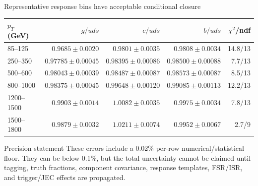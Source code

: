 \documentclass[aspectratio=169,10pt]{beamer}
\begin{document}
\begin{frame}{Representative response bins have acceptable conditional closure}
\centering
\small
\begin{tabular}{lrrrr}
\toprule
$p_T$ (GeV) & $g/uds$ & $c/uds$ & $b/uds$ & $\chi^2$/ndf\\
\midrule
85--125 & $0.9685\pm0.0020$ & $0.9801\pm0.0035$ & $0.9808\pm0.0034$ & 14.8/13\\
250--350 & $0.97785\pm0.00045$ & $0.98395\pm0.00086$ & $0.98500\pm0.00088$ & 7.7/13\\
500--600 & $0.98043\pm0.00039$ & $0.98487\pm0.00087$ & $0.98573\pm0.00087$ & 8.5/13\\
800--1000 & $0.98375\pm0.00045$ & $0.99648\pm0.00120$ & $0.99085\pm0.00113$ & 12.2/13\\
1200--1500 & $0.9903\pm0.0014$ & $1.0082\pm0.0035$ & $0.9975\pm0.0034$ & 7.8/13\\
1500--1800 & $0.9879\pm0.0032$ & $1.0211\pm0.0074$ & $0.9952\pm0.0067$ & 2.7/9\\
\bottomrule
\end{tabular}
\vspace{0.8em}
\begin{alertblock}{Precision statement}
These errors include a 0.02\% per-row numerical/statistical floor. They can be below 0.1\%, but the total uncertainty cannot be claimed until tagging, truth fractions, component covariance, response templates, FSR/ISR, and trigger/JEC effects are propagated.
\end{alertblock}
\end{frame}
\end{document}
